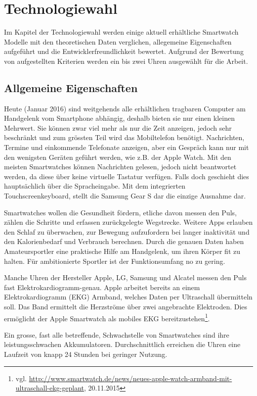 \chapter{Technologiewahl}
Im Kapitel der Technologiewahl werden einige aktuell erhältliche Smartwatch Modelle mit den theoretischen Daten verglichen, allegemeine Eigenschaften aufgeführt und die Entwicklerfreundlichkeit bewertet. Aufgrund der Bewertung von aufgestellten Kriterien werden ein bis zwei Uhren ausgewählt für die Arbeit.

\section{Allgemeine Eigenschaften}
Heute (Januar 2016) sind weitgehends alle erhältlichen tragbaren Computer am Handgelenk vom Smartphone abhängig, deshalb bieten sie nur einen kleinen Mehrwert. Sie können zwar viel mehr als nur die Zeit anzeigen, jedoch sehr beschränkt und zum grössten Teil wird das Mobiltelefon benötigt. Nachrichten, Termine und einkommende Telefonate anzeigen, aber ein Gespräch kann nur mit den wenigsten Geräten geführt werden, wie z.B. der Apple Watch. Mit den meisten Smartwatches können Nachrichten gelesen, jedoch nicht beantwortet werden, da diese über keine virtuelle Tastatur verfügen. Falls doch geschieht dies hauptsächlich über die Spracheingabe. Mit dem integrierten Touchscreenkeyboard, stellt die Samsung Gear S dar die einzige Ausnahme dar.

Smartwatches wollen die Gesundheit fördern, etliche davon messen den Puls, zählen die Schritte und erfassen zurückgelegte Wegstrecke. Weitere Apps erlauben den Schlaf zu überwachen, zur Bewegung aufzufordern bei langer inaktivität und den Kalorienbedarf und Verbrauch berechnen. Durch die genauen Daten haben Amateursportler eine praktische Hilfe am Handgelenk, um ihren Körper fit zu halten. Für ambitionierte Sportler ist der Funktionsumfang no zu gering.

Manche Uhren der Hersteller Apple, LG, Samsung und Alcatel messen den Puls fast Elektrokardiogramm-genau. Apple arbeitet bereits an einem Elektrokardiogramm (EKG) Armband, welches Daten per Ultraschall übermitteln soll. Das Band ermittelt die Herzströme über zwei angebrachte Elektroden. Dies ermöglicht der Apple Smartwatch als mobiles EKG bereitzustehen\footnote{vgl. \url{http://www.smartwatch.de/news/neues-apple-watch-armband-mit-ultraschall-ekg-geplant}, 20.11.2015}.

Ein grosse, fast alle betreffende, Schwachstelle von Smartwatches sind ihre leistungsschwachen Akkumulatoren. Durchschnittlich erreichen die Uhren eine Laufzeit von knapp 24 Stunden bei geringer Nutzung.

